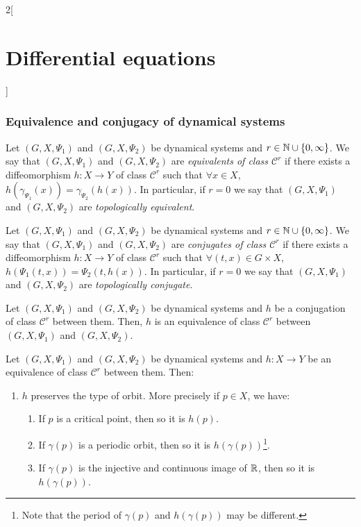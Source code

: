 \documentclass[../../../main.tex]{subfiles}
\begin{document}
\begin{multicols}{2}[\section{Differential equations}]
    \subsubsection{Equivalence and conjugacy of dynamical systems}
    \begin{definition}
        Let $(G,X,\Psi_1)$ and $(G,X,\Psi_2)$ be dynamical systems and $r\in\mathbb{N}\cup\{0,\infty\}$. We say that $(G,X,\Psi_1)$ and $(G,X,\Psi_2)$ are \textit{equivalents of class $\mathcal{C}^r$} if there exists a diffeomorphism $h:X\rightarrow Y$ of class $\mathcal{C}^r$ such that $\forall x\in X$, $h(\gamma_{\Psi_1}(x))=\gamma_{\Psi_2}(h(x))$. In particular, if $r=0$ we say that $(G,X,\Psi_1)$ and $(G,X,\Psi_2)$ are \textit{topologically equivalent}.
    \end{definition}
    \begin{definition}
        Let $(G,X,\Psi_1)$ and $(G,X,\Psi_2)$ be dynamical systems and $r\in\mathbb{N}\cup\{0,\infty\}$. We say that $(G,X,\Psi_1)$ and $(G,X,\Psi_2)$ are \textit{conjugates of class $\mathcal{C}^r$} if there exists a diffeomorphism $h:X\rightarrow Y$ of class $\mathcal{C}^r$ such that $\forall (t,x)\in G\times X$, $h(\Psi_1(t,x))=\Psi_2(t,h(x))$. In particular, if $r=0$ we say that $(G,X,\Psi_1)$ and $(G,X,\Psi_2)$ are \textit{topologically conjugate}.
    \end{definition}
    \begin{prop}
        Let $(G,X,\Psi_1)$ and $(G,X,\Psi_2)$ be dynamical systems and $h$ be a conjugation of class $\mathcal{C}^r$ between them. Then, $h$ is an equivalence of class $\mathcal{C}^r$ between $(G,X,\Psi_1)$ and $(G,X,\Psi_2)$.
    \end{prop}
    \begin{prop}
        Let $(G,X,\Psi_1)$ and $(G,X,\Psi_2)$ be dynamical systems and $h:X\rightarrow Y$ be an equivalence of class $\mathcal{C}^r$ between them. Then:
        \begin{enumerate}
            \item $h$ preserves the type of orbit. More precisely if $p\in X$, we have:
                  \begin{enumerate}
                      \item If $p$ is a critical point, then so it is $h(p)$.
                      \item If $\gamma(p)$ is a periodic orbit, then so it is $h(\gamma(p))$\footnote{Note that the period of $\gamma(p)$ and $h(\gamma(p))$ may be different.}.
                      \item If $\gamma(p)$ is the injective and continuous image of $\mathbb{R}$, then so it is $h(\gamma(p))$.

\end{enumerate}
\end{enumerate}
\end{prop}
\end{multicols}
\end{document}
